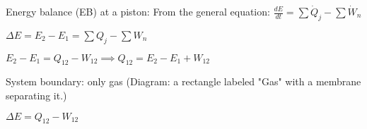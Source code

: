 Energy balance (EB) at a piston:  
From the general equation:  
\( \frac{dE}{dt} = \sum \dot{Q}_j - \sum \dot{W}_n \)  

\( \Delta E = E_2 - E_1 = \sum Q_j - \sum W_n \)  

\( E_2 - E_1 = Q_{12} - W_{12} \implies Q_{12} = E_2 - E_1 + W_{12} \)  

System boundary: only gas  
(Diagram: a rectangle labeled "Gas" with a membrane separating it.)  

\( \Delta E = Q_{12} - W_{12} \)